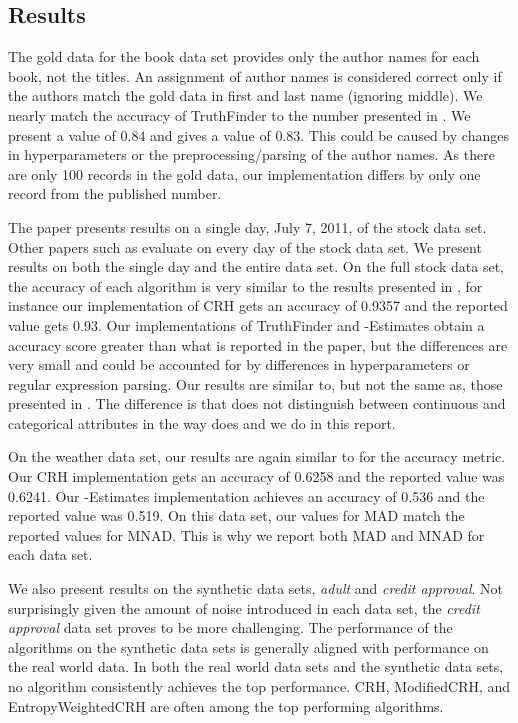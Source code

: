 \documentclass{acm_proc_article-sp}
\begin{document}
\subsection{Results} \label{sec:results}

The gold data for the book data set provides only the author names for each book, not the titles. An assignment of author names is considered correct only if the authors  match the gold data in first and last name (ignoring middle). We nearly match the accuracy of {\sc TruthFinder } to the number presented in \cite{dong:integrating}. We present a value of $0.84$ and \cite{dong:integrating} gives a value of $0.83$. This could be caused by changes in hyperparameters or the preprocessing/parsing of the author names. As there are only 100 records in the gold data, our implementation differs by only one record from the published number. 

The paper \cite{li:truth} presents results on a single day, July 7, 2011, of the stock data set. Other papers such as \cite{li:resolving} evaluate on every day of the stock data set. We present results on both the single day and the entire data set. On the full stock data set, the accuracy of each algorithm is very similar to the results presented in \cite{li:resolving}, for instance our implementation of CRH gets an accuracy of 0.9357 and the reported value gets 0.93. Our implementations of {\sc TruthFinder} and {-Estimates} obtain a accuracy score greater than what is reported in the paper, but the differences are very small and could be accounted for by differences in hyperparameters or regular expression parsing. Our results are similar to, but not the same as, those presented in \cite{li:truth}. The difference is that \cite{li:truth} does not distinguish between continuous and categorical attributes in the way \cite{li:resolving} does and we do in this report.  

On the weather data set, our results are again similar to \cite{li:truth} for the accuracy  metric. Our {\sc CRH} implementation gets an accuracy of 0.6258 and the reported value was 0.6241. Our {-Estimates} implementation  achieves an accuracy of 0.536 and the reported value was 0.519. On this data set, our values for MAD match the reported values for MNAD. This is why we report both MAD and MNAD for each data set. 

We also present results on the synthetic data sets, \emph{adult} and \emph{credit approval}. Not surprisingly given the amount of noise introduced in each data set, the \emph{credit approval} data set proves to be more challenging. The performance of the algorithms on the synthetic data sets is generally aligned with performance on the real world data. In both the real world data sets and the synthetic data sets, no algorithm consistently achieves the top performance. {\sc CRH}, {\sc ModifiedCRH}, and {\sc EntropyWeightedCRH} are often among the top performing algorithms.   
\end{document}
